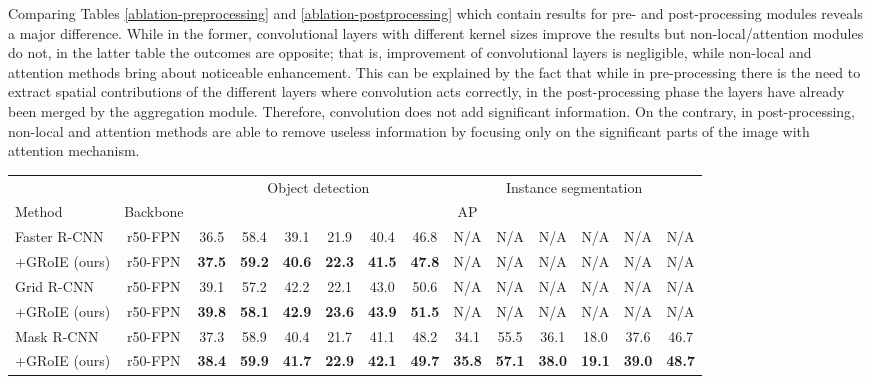 \documentclass[10pt,conference,a4paper]{IEEEtran}
\begin{document}
Comparing Tables \ref{ablation-preprocessing} and \ref{ablation-postprocessing} which contain results for pre- and post-processing modules reveals a major difference.
While in the former, convolutional layers with different kernel sizes improve the results but non-local/attention modules do not, in the latter table the outcomes are opposite;
that is, improvement of convolutional layers is negligible, while non-local and attention methods bring about noticeable enhancement.
This can be explained by the fact that while in pre-processing there is the need to extract spatial contributions of the different layers where convolution acts correctly, in the post-processing phase the layers have already been merged by the aggregation module.
Therefore, convolution does not add significant information.
On the contrary, in post-processing, non-local and attention methods are able to remove useless information by focusing only on the significant parts of the image with attention mechanism. \begin{table*}
  \begin{center}
    \begin{tabular}{l|c||c|c|c|c|c|c||c|c|c|c|c|c}
      & & \multicolumn{6}{c||}{Object detection} & \multicolumn{6}{c}{Instance segmentation} \\
      Method & Backbone &  &  &   &  &  &   & AP &  &   &  &  & \\
      \hline\hline
      Faster R-CNN  & r50-FPN & 36.5 & 58.4 & 39.1 & 21.9 & 40.4 & 46.8 & N/A & N/A & N/A & N/A & N/A & N/A \\
      +GRoIE (ours) & r50-FPN & \textbf{37.5} & \textbf{59.2} & \textbf{40.6} & \textbf{22.3} & \textbf{41.5} & \textbf{47.8} & N/A & N/A & N/A & N/A & N/A & N/A \\
      \hline\hline
Grid R-CNN    & r50-FPN & 39.1 & 57.2 & 42.2 & 22.1 & 43.0 & 50.6 & N/A & N/A & N/A & N/A & N/A & N/A \\
      +GRoIE (ours) & r50-FPN & \textbf{39.8} & \textbf{58.1} & \textbf{42.9} & \textbf{23.6} & \textbf{43.9} & \textbf{51.5} & N/A & N/A & N/A & N/A & N/A & N/A \\
      \hline\hline
      Mask R-CNN    & r50-FPN & 37.3 & 58.9 & 40.4 & 21.7 & 41.1 & 48.2 & 34.1 & 55.5 & 36.1 & 18.0 & 37.6 & 46.7 \\
      +GRoIE (ours) & r50-FPN & \textbf{38.4} & \textbf{59.9} & \textbf{41.7} & \textbf{22.9} & \textbf{42.1} & \textbf{49.7} & \textbf{35.8} & \textbf{57.1} & \textbf{38.0} & \textbf{19.1} & \textbf{39.0} & \textbf{48.7} \\

\end{tabular}
\end{center}
\end{table*}
\end{document}
